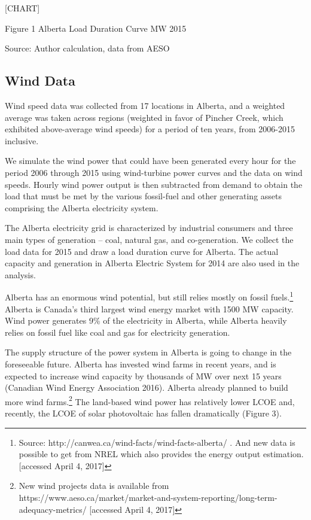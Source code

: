\documentclass[10pt,letter]{article}
\begin{document}
{{[}CHART{]}}

Figure 1 Alberta Load Duration Curve MW 2015

Source: Author calculation, data from AESO

\subsection{Wind Data}\label{wind-data}

Wind speed data was collected from 17 locations in Alberta, and a
weighted average was taken across regions (weighted in favor of Pincher
Creek, which exhibited above-average wind speeds) for a period of ten
years, from 2006-2015 inclusive.

We simulate the wind power that could have been generated every hour for
the period 2006 through 2015 using wind-turbine power curves and the
data on wind speeds. Hourly wind power output is then subtracted from
demand to obtain the load that must be met by the various fossil-fuel
and other generating assets comprising the Alberta electricity system.

The Alberta electricity grid is characterized by industrial consumers
and three main types of generation -- coal, natural gas, and
co-generation. We collect the load data for 2015 and draw a load
duration curve for Alberta. The actual capacity and generation in
Alberta Electric System for 2014 are also used in the analysis.

Alberta has an enormous wind potential, but still relies mostly on
fossil fuels.\footnote{Source:
  http://canwea.ca/wind-facts/wind-facts-alberta/ . And new data is
  possible to get from NREL which also provides the energy output
  estimation. {[}accessed April 4, 2017{]}} Alberta is Canada's third
largest wind energy market with 1500 MW capacity. Wind power generates
9\% of the electricity in Alberta, while Alberta heavily relies on
fossil fuel like coal and gas for electricity generation.

The supply structure of the power system in Alberta is going to change
in the foreseeable future. Alberta has invested wind farms in recent
years, and is expected to increase wind capacity by thousands of MW over
next 15 years (Canadian Wind Energy Association 2016). Alberta already
planned to build more wind farms.\footnote{New wind projects data is
  available from
  https://www.aeso.ca/market/market-and-system-reporting/long-term-adequacy-metrics/
  {[}accessed April 4, 2017{]}} The land-based wind power has relatively
lower LCOE and, recently, the LCOE of solar photovoltaic has fallen
dramatically (Figure 3).
\end{document}
